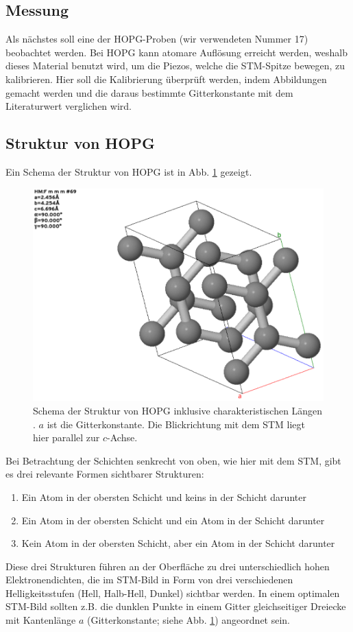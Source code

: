 \documentclass{article}
\begin{document}
\subsection{Messung}
Als nächstes soll eine der HOPG-Proben (wir verwendeten Nummer 17) beobachtet werden.
Bei HOPG kann atomare Auflösung erreicht werden, weshalb dieses Material benutzt wird, um die Piezos, welche die STM-Spitze
bewegen, zu kalibrieren. Hier soll die Kalibrierung überprüft werden, indem Abbildungen gemacht werden und die daraus
bestimmte Gitterkonstante mit dem Literaturwert verglichen wird.

\subsection{Struktur von HOPG}
Ein Schema der Struktur von HOPG ist in Abb. \ref{fig:hopg-structure} gezeigt.
\begin{figure}[h]
    \centering
    \includegraphics[width=0.5\linewidth]{hopg-structure}
    \caption{
        Schema der Struktur von HOPG inklusive charakteristischen Längen \cite{graphite}. $a$ ist die Gitterkonstante.
        Die Blickrichtung mit dem STM liegt hier parallel zur $c$-Achse.
    }
    \label{fig:hopg-structure}
\end{figure}
Bei Betrachtung der Schichten senkrecht von oben, wie hier mit dem STM, gibt es drei relevante Formen sichtbarer Strukturen:
\begin{enumerate}
  \item Ein Atom in der obersten Schicht und keins in der Schicht darunter
  \item Ein Atom in der obersten Schicht und ein Atom in der Schicht darunter
  \item Kein Atom in der obersten Schicht, aber ein Atom in der Schicht darunter
\end{enumerate}
Diese drei Strukturen führen an der Oberfläche zu drei unterschiedlich hohen Elektronendichten,
die im STM-Bild in Form von drei verschiedenen Helligkeitsstufen (Hell, Halb-Hell, Dunkel) sichtbar werden.
In einem optimalen STM-Bild sollten z.B. die dunklen Punkte in
einem Gitter gleichseitiger Dreiecke mit Kantenlänge $a$ (Gitterkonstante; siehe Abb. \ref{fig:hopg-structure}) angeordnet sein.
\end{document}
